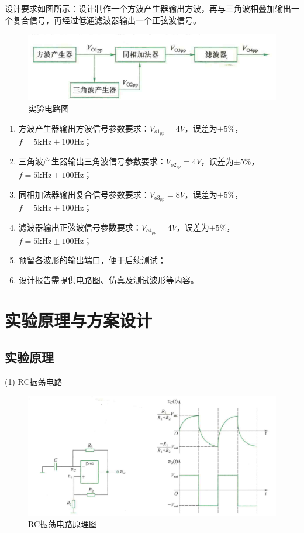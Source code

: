 \documentclass[12pt, a4paper]{article}
\begin{document}
设计要求如图所示：设计制作一个方波产生器输出方波，再与三角波相叠加输出一个复合信号，再经过低通滤波器输出一个正弦波信号。

\begin{figure}[h]
    \centering
    \includegraphics[width=\linewidth]{image/1.png}
    \caption{实验电路图}
    \label{fig:实验电路图}
\end{figure}

\begin{enumerate}[leftmargin=50pt, label=(\arabic*)]
    \item 方波产生器输出方波信号参数要求：$V_{o1_{pp}} = 4V$，误差为$\pm 5\%$，$f = 5\text{kHz} \pm 100\text{Hz}$；
    \item 三角波产生器输出三角波信号参数要求：$V_{o2_{pp}} = 4V$，误差为$\pm 5\%$，$f = 5\text{kHz} \pm 100\text{Hz}$；
    \item 同相加法器输出复合信号参数要求：$V_{o3_{pp}} = 8V$，误差为$\pm 5\%$，$f = 5\text{kHz} \pm 100\text{Hz}$；
    \item 滤波器输出正弦波信号参数要求：$V_{o4_{pp}} = 4V$，误差为$\pm 5\%$，$f = 5\text{kHz} \pm 100\text{Hz}$；
    \item 预留各波形的输出端口，便于后续测试；
    \item 设计报告需提供电路图、仿真及测试波形等内容。
\end{enumerate}

\clearpage
\section{实验原理与方案设计}

\subsection{实验原理}
(1) RC振荡电路
\begin{figure}[ht]
    \centering
    \includegraphics[width=0.6\linewidth]{image/2.png}
    \caption{RC振荡电路原理图}
    \label{fig:RC振荡电路原理图}
\end{figure}
\end{document}
